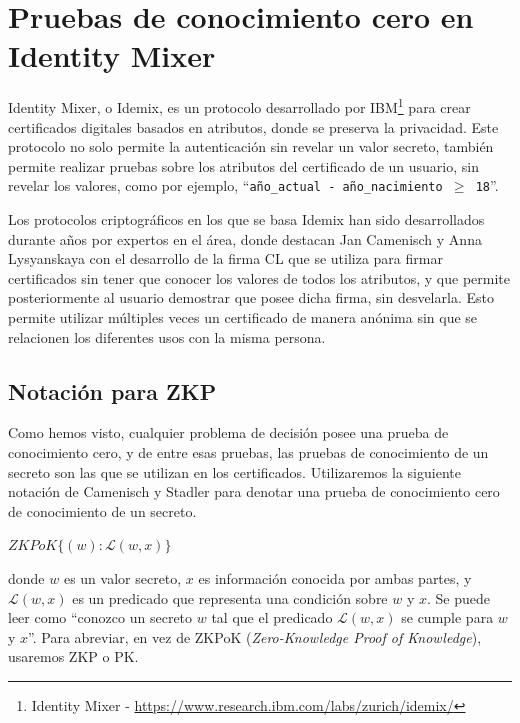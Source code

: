 %
%
%
%
%





\section{Pruebas de conocimiento cero en Identity Mixer}

Identity Mixer, o Idemix, es un protocolo desarrollado por IBM\footnote{Identity Mixer - \url{https://www.research.ibm.com/labs/zurich/idemix/}} para crear certificados digitales basados en atributos, donde se preserva la privacidad. Este protocolo no solo permite la autenticación sin revelar un valor secreto, también permite realizar pruebas sobre los atributos del certificado de un usuario, sin revelar los valores, como por ejemplo, ``\texttt{año\_actual - año\_nacimiento $\geq$ 18}''.

Los protocolos criptográficos en los que se basa Idemix \citep{idemixSpec} han sido desarrollados durante años por expertos en el área, donde destacan Jan Camenisch y Anna Lysyanskaya con el desarrollo de la firma CL \citep{camenisch2002signature} \citep{camenisch2001efficient} que se utiliza para firmar certificados sin tener que conocer los valores de todos los atributos, y que permite posteriormente al usuario demostrar que posee dicha firma, sin desvelarla. Esto permite utilizar múltiples veces un certificado de manera anónima sin que se relacionen los diferentes usos con la misma persona.





\subsection{Notación para ZKP}

Como hemos visto, cualquier problema de decisión posee una prueba de conocimiento cero, y de entre esas pruebas, las pruebas de conocimiento de un secreto son las que se utilizan en los certificados. Utilizaremos la siguiente notación de Camenisch y Stadler \citep{camenisch1997efficient} para denotar una prueba de conocimiento cero de conocimiento de un secreto.

\begin{center}
	$ZKPoK\{ (w) : \mathcal{L}(w,x) \}$
\end{center}
donde $w$ es un valor secreto, $x$ es información conocida por ambas partes, y $\mathcal{L}(w,x)$ es un predicado que representa una condición sobre $w$ y $x$. Se puede leer como ``conozco un secreto $w$ tal que el predicado $\mathcal{L}(w,x)$ se cumple para $w$ y $x$''. Para abreviar, en vez de ZKPoK (\textit{Zero-Knowledge Proof of Knowledge}), usaremos ZKP o PK.

